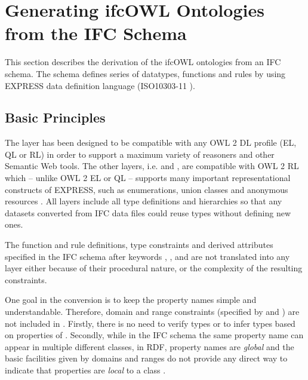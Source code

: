 
\section{Generating ifcOWL Ontologies from the IFC Schema}
\label{sec:ifcOWL}
This section describes the derivation of the ifcOWL ontologies from an IFC schema. The schema defines series of datatypes, functions and rules by using EXPRESS data definition language (ISO10303-11 \cite{schenck1994information}).

\subsection{Basic Principles}

The \ifcsimple{} layer has been designed to be compatible with any OWL 2 DL profile (EL, QL or RL) in order to support a maximum variety of reasoners and other Semantic Web tools. The other layers, i.e. \standard{} and \extended{}, are compatible with OWL 2 RL which -- unlike OWL 2 EL or QL -- supports many important representational constructs of EXPRESS, such as enumerations, union classes and anonymous resources \cite{motik2012owl}. All \ifcowl{} layers include all type definitions and hierarchies so that any \ifcrdf{} datasets converted from IFC data files could reuse types without defining new ones.

The function and rule definitions, type constraints and derived attributes specified in the IFC schema after keywords , , and  are not translated into any \ifcowl{} layer either because of their procedural nature, or the complexity of the resulting constraints.

One goal in the conversion is to keep the property names simple and understandable. Therefore, domain and range constraints (specified by  and ) are not included in \ifcowl{}. Firstly, there is no need to verify types or to infer types based on properties of \ifcowl{}. Secondly, while in the IFC schema the same property name can appear in multiple different classes, in RDF, property names are \emph{global} and the basic facilities given by domains and ranges do not provide any direct way to indicate that properties are \emph{local} to a class \cite{world2014rdf}. 

